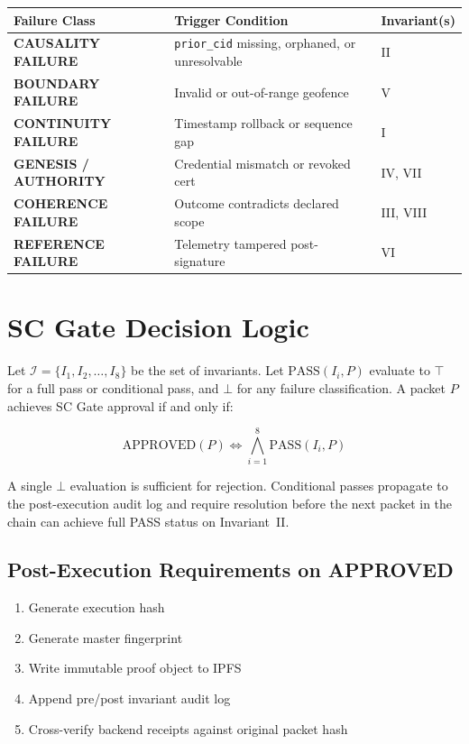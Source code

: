 \documentclass[11pt]{article}
\theoremstyle{invariantstyle}
\theoremstyle{defstyle}
\begin{document}
\begin{center}
\renewcommand{\arraystretch}{1.4}
\begin{tabular}{>{\bfseries}p{5.2cm} p{5.2cm} p{2.6cm}}
\toprule
\textbf{Failure Class} & \textbf{Trigger Condition} & \textbf{Invariant(s)} \\
\midrule
CAUSALITY FAILURE      & \texttt{prior\_cid} missing, orphaned, or unresolvable & II \\
BOUNDARY FAILURE       & Invalid or out-of-range geofence                       & V \\
CONTINUITY FAILURE     & Timestamp rollback or sequence gap                     & I \\
GENESIS / AUTHORITY    & Credential mismatch or revoked cert                    & IV, VII \\
COHERENCE FAILURE      & Outcome contradicts declared scope                     & III, VIII \\
REFERENCE FAILURE      & Telemetry tampered post-signature                      & VI \\
\bottomrule
\end{tabular}
\end{center}

\section{SC Gate Decision Logic}

Let $\mathcal{I} = \{I_1, I_2, \ldots, I_8\}$ be the set of invariants. Let
$\text{PASS}(I_i, P)$ evaluate to $\top$ for a full pass or conditional pass,
and $\bot$ for any failure classification. A packet $P$ achieves SC Gate
approval if and only if:

\[
\boxed{\text{APPROVED}(P) \iff \bigwedge_{i=1}^{8} \text{PASS}(I_i, P)}
\]

A single $\bot$ evaluation is sufficient for rejection. Conditional passes
propagate to the post-execution audit log and require resolution before
the next packet in the chain can achieve full PASS status on Invariant~II.

\subsection*{Post-Execution Requirements on APPROVED}

\begin{enumerate}[leftmargin=*, label=\arabic{enumi}.]
  \item Generate execution hash
  \item Generate master fingerprint
  \item Write immutable proof object to IPFS
  \item Append pre/post invariant audit log
  \item Cross-verify backend receipts against original packet hash
\end{enumerate}
\end{document}

